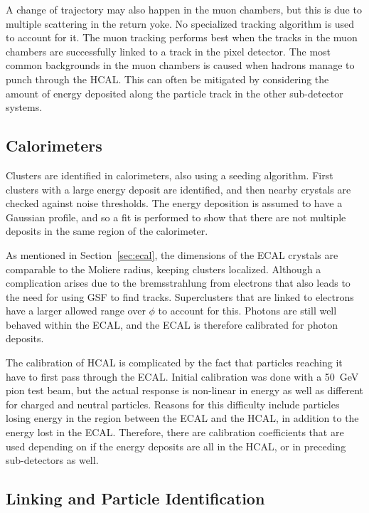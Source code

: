A change of trajectory may also happen in the muon chambers,
but this is due to multiple scattering in the return yoke.
No specialized tracking algorithm is used to account for it.
The muon tracking performs best when the tracks in the muon chambers are successfully
linked to a track in the pixel detector.
The most common backgrounds in the muon chambers
is caused when hadrons manage to punch through the HCAL.
This can often be mitigated by considering the amount of energy deposited along the particle
track in the other sub-detector systems.

\subsection{Calorimeters} \label{sec:calorimeters}

Clusters are identified in calorimeters, also using a seeding algorithm.
First clusters with a large energy deposit are identified,
and then nearby crystals are checked against noise thresholds.
The energy deposition is assumed to have a Gaussian profile,
and so a fit is performed to show that there are not multiple deposits in the same
region of the calorimeter.

As mentioned in Section~\ref{sec:ecal}, the dimensions of the ECAL crystals
are comparable to the Moliere radius, keeping clusters localized.
Although a complication arises due to the bremsstrahlung from electrons that also leads to
the need for using GSF to find tracks.
Superclusters that are linked to electrons have
a larger allowed range over $\phi$ to account for this.
Photons are still well behaved within the ECAL,
and the ECAL is therefore calibrated for photon deposits.

The calibration of HCAL is complicated by the fact that particles reaching it
have to first pass through the ECAL.
Initial calibration was done with a \SI{50}{GeV} pion test beam,
but the actual response is non-linear in energy
as well as different for charged and neutral particles.
Reasons for this difficulty include particles losing energy in the region
between the ECAL and the HCAL, in addition to the energy lost in the ECAL.
Therefore, there are calibration coefficients that are used
depending on if the energy deposits are all in the HCAL,
or in preceding sub-detectors as well.

\subsection{Linking and Particle Identification}

